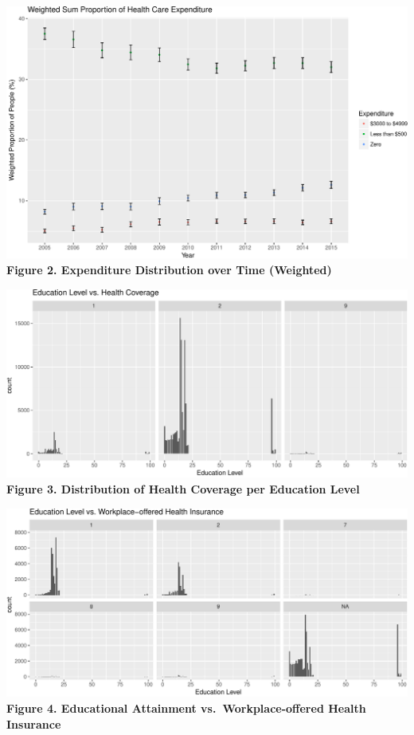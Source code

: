 \documentclass[10pt,]{article}
\makeatletter
\def\maxwidth{\ifdim\Gin@nat@width>\linewidth\linewidth
\else\Gin@nat@width\fi}
\let\Oldincludegraphics\includegraphics
\renewcommand{\includegraphics}[1]{\Oldincludegraphics[width=\maxwidth]{#1}}
\makeatother
\begin{document}
\smallskip

\includegraphics{paper_files/figure-latex/weightedexpendproportion-1.pdf}
\textbf{Figure 2. Expenditure Distribution over Time (Weighted)}

\smallskip

\includegraphics{paper_files/figure-latex/healthcovereduattainment-1.pdf}
\textbf{Figure 3. Distribution of Health Coverage per Education Level}

\smallskip

\includegraphics{paper_files/figure-latex/workhealthinsuranceeduattainment-1.pdf}
\textbf{Figure 4. Educational Attainment vs.~Workplace-offered Health
Insurance}
\end{document}
